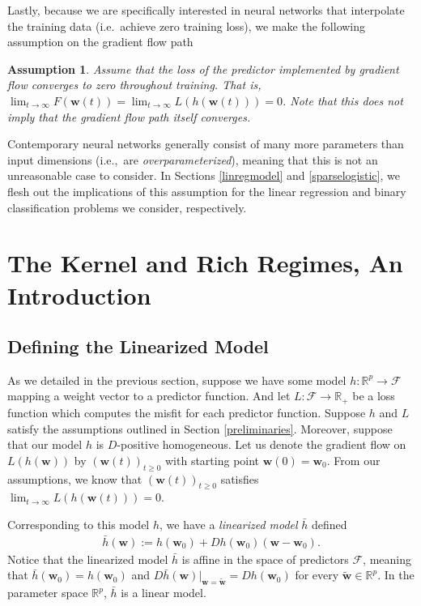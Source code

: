 \documentclass{article}
\newtheorem*{assumption}{Assumption}
\begin{document}
Lastly, because we are specifically interested in neural networks that interpolate the training data (i.e.~achieve zero training loss), we make the following assumption on the gradient flow path
\begin{assumption}
Assume that the loss of the predictor implemented by gradient flow converges to zero throughout training. That is, $\lim_{t \to \infty} F(\boldsymbol{w}(t)) = \lim_{t \to \infty} L(h(\boldsymbol{w}(t))) = 0$. Note that this does not imply that the gradient flow path itself converges.
\end{assumption}
Contemporary neural networks generally consist of many more parameters than input dimensions (i.e.,~are \textit{overparameterized}), meaning that this is not an unreasonable case to consider. In Sections \ref{linregmodel} and \ref{sparselogistic}, we flesh out the implications of this assumption for the linear regression and binary classification problems we consider, respectively.


\section{The Kernel and Rich Regimes, An Introduction}\label{richkernel}

\subsection{Defining the Linearized Model}
As we detailed in the previous section, suppose we have some model $h: \mathbb{R}^p \rightarrow \mathcal{F}$ mapping a weight vector to a predictor function. And let $L: \mathcal{F} \rightarrow \mathbb{R}_+$ be a loss function which computes the misfit for each predictor function. Suppose $h$ and $L$ satisfy the assumptions outlined in Section \ref{preliminaries}. Moreover, suppose that our model $h$ is $D$-positive homogeneous. Let us denote the gradient flow on $L(h(\boldsymbol{w}))$ by $(\boldsymbol{w}(t))_{t \geq 0}$ with starting point $\boldsymbol{w}(0) = \boldsymbol{w}_0$. From our assumptions, we know that $(\boldsymbol{w}(t))_{t \geq 0}$ satisfies $\lim_{t \to \infty} L(h(\boldsymbol{w}(t))) = 0$.

Corresponding to this model $h$, we have a \textit{linearized model} $\bar{h}$ defined
\begin{align}
    \bar{h}(\boldsymbol{w}) := h(\boldsymbol{w}_0) + Dh(\boldsymbol{w}_0)(\boldsymbol{w}-\boldsymbol{w}_0).\label{linearizedmodel}
\end{align}
Notice that the linearized model $\bar{h}$ is affine in the space of predictors $\mathcal{F}$, meaning that $\bar{h}(\boldsymbol{w}_0) = h(\boldsymbol{w}_0)$ and $D \bar{h}(\boldsymbol{w})|_{\boldsymbol{w} = \boldsymbol{\tilde{w}}} = D h(\boldsymbol{w}_0)$ for every $\boldsymbol{\tilde{w}} \in \mathbb{R}^p$. In the parameter space $\mathbb{R}^p$, $\bar{h}$ is a linear model.
\end{document}
